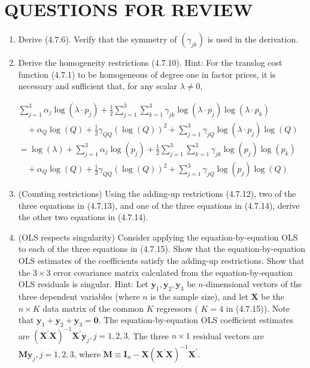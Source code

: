 \documentclass[10pt]{article}
\begin{document}
\section*{QUESTIONS FOR REVIEW}
\begin{enumerate}
  \item Derive (4.7.6). Verify that the symmetry of $\left(\gamma_{j k}\right)$ is used in the derivation.
  \item Derive the homogeneity restrictions (4.7.10). Hint: For the translog cost function (4.7.1) to be homogeneous of degree one in factor prices, it is necessary and sufficient that, for any scalar $\lambda \neq 0$,
\end{enumerate}

$$
\begin{aligned}
& \sum_{j=1}^{3} \alpha_{j} \log \left(\lambda \cdot p_{j}\right)+\frac{1}{2} \sum_{j=1}^{3} \sum_{k=1}^{3} \gamma_{j k} \log \left(\lambda \cdot p_{j}\right) \log \left(\lambda \cdot p_{k}\right) \\
& \quad+\alpha_{Q} \log (Q)+\frac{1}{2} \gamma_{Q Q}(\log (Q))^{2}+\sum_{j=1}^{3} \gamma_{j Q} \log \left(\lambda \cdot p_{j}\right) \log (Q) \\
& =\log (\lambda)+\sum_{j=1}^{3} \alpha_{j} \log \left(p_{j}\right)+\frac{1}{2} \sum_{j=1}^{3} \sum_{k=1}^{3} \gamma_{j k} \log \left(p_{j}\right) \log \left(p_{k}\right) \\
& \quad+\alpha_{Q} \log (Q)+\frac{1}{2} \gamma_{Q Q}(\log (Q))^{2}+\sum_{j=1}^{3} \gamma_{j Q} \log \left(p_{j}\right) \log (Q)
\end{aligned}
$$

\begin{enumerate}
  \setcounter{enumi}{2}
  \item (Counting restrictions) Using the adding-up restrictions (4.7.12), two of the three equations in (4.7.13), and one of the three equations in (4.7.14), derive the other two equations in (4.7.14).
  \item (OLS respects singularity) Consider applying the equation-by-equation OLS to each of the three equations in (4.7.15). Show that the equation-by-equation OLS estimates of the coefficients satisfy the adding-up restrictions. Show that the $3 \times 3$ error covariance matrix calculated from the equation-by-equation OLS residuals is singular. Hint: Let $\mathbf{y}_{1}, \mathbf{y}_{2}, \mathbf{y}_{3}$ be $n$-dimensional vectors of the three dependent variables (where $n$ is the sample size), and let $\mathbf{X}$ be the $n \times K$ data matrix of the common $K$ regressors ( $K=4$ in (4.7.15)). Note that $\mathbf{y}_{1}+\mathbf{y}_{2}+\mathbf{y}_{3}=\mathbf{0}$. The equation-by-equation OLS coefficient estimates are $\left(\mathbf{X}^{\prime} \mathbf{X}\right)^{-1} \mathbf{X}^{\prime} \mathbf{y}_{j}, j=1,2,3$. The three $n \times 1$ residual vectors are $\mathbf{M} \mathbf{y}_{j}, j=1,2,3$, where $\mathbf{M} \equiv \mathbf{I}_{n}-\mathbf{X}\left(\mathbf{X}^{\prime} \mathbf{X}\right)^{-1} \mathbf{X}^{\prime}$.
\end{enumerate}
\end{document}
